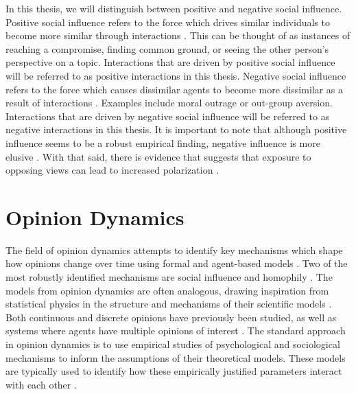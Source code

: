 \documentclass[11pt]{article}
\begin{document}
In this thesis, we will distinguish between positive and negative social influence. Positive social influence refers to the force which drives similar individuals to become more similar through interactions \cite{flache_models_2017,levin_dynamics_2021}. 
This can be thought of as instances of reaching a compromise, finding common ground, or seeing the other person’s perspective on a topic. Interactions that are driven by positive social influence will be referred to as positive interactions in this thesis. Negative social influence refers to the force which causes dissimilar agents to become more dissimilar as a result of interactions \cite{flache_models_2017}. 
Examples include moral outrage or out-group aversion. Interactions that are driven by negative social influence will be referred to as negative interactions in this thesis. It is important to note that although positive influence seems to be a robust empirical finding, negative influence is more elusive \cite{flache_models_2017,takacs_is_2014,turner_paths_2018}. 
With that said, there is evidence that suggests that exposure to opposing views can lead to increased polarization \cite{bail_exposure_2018, hilmert2006positive, cikara2014neuroscience}.

\section{Opinion Dynamics}
The field of opinion dynamics attempts to identify key mechanisms which shape how opinions change over time using formal and agent-based models \cite{flache_models_2017,flache_between_2018,noorazar_classical_2020}. Two of the most robustly identified mechanisms are social influence and homophily \cite{flache_models_2017}. The models from opinion dynamics are often analogous, drawing inspiration from statistical physics in the structure and mechanisms of their scientific models \cite{galesic_integrating_2021}. Both continuous and discrete opinions have previously been studied, as well as systems where agents have multiple opinions of interest \cite{flache_models_2017}. The standard approach in opinion dynamics is to use empirical studies of psychological and sociological mechanisms to inform the assumptions of their theoretical models. These models are typically used to identify how these empirically justified parameters interact with each other  \cite{baumann2021modeling,chacoma_opinion_2015,flache_models_2017,friedkin_social_1990,noorazar_classical_2020,spears_social_2021,turner_paths_2018}. 
\end{document}
